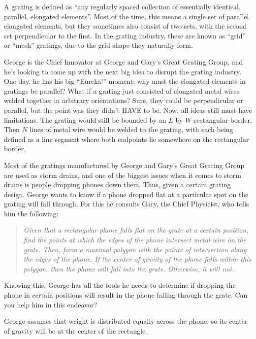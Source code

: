 
A grating is defined as ``any regularly spaced collection of essentially identical, parallel, elongated
elements''. Most of the time, this means a single set of parallel elongated elements, but they sometimes also
consist of two sets, with the second set perpendicular to the first. In the grating industry, these are
known as ``grid'' or ``mesh'' gratings, due to the grid shape they naturally form.

George is the Chief Innovator at George and Gary's Great Grating Group, and he's looking to come up with the 
next big idea to disrupt the grating industry. One day, he has his big ``Eureka!'' moment: why must the
elongated elements in gratings be parallel? What if a grating just consisted of elongated metal wires welded
together in arbitrary orientations? Sure, they could be perpendicular or parallel, but the point was they
didn't HAVE to be. Now, all ideas still must have limitations. The grating would still be bounded by an
$L$ by $W$ rectangular border. Then $N$ lines of metal wire would be welded to the grating, with each
being defined as a line segment where both endpoints lie somewhere on the rectangular border.

Most of the gratings manufactured by George and Gary's Great Grating Group are used as storm drains, and
one of the biggest issues when it comes to storm drains is people dropping phones down them. Thus,
given a certain grating design, George wants to know if a phone dropped flat at a particular spot on the
grating will fall through. For this he consults Gary, the Chief Physicist, who tells him the following:

\begin{quotation}
\textit{
    Given that a rectangular phone falls flat on the grate at a certain position, find the points
    at which the edges of the phone intersect metal wire on the grate. Then, form a maximal polygon with
    the points of intersection along the edges of the phone. If the center of gravity of the phone falls
    within this polygon, then the phone will fall into the grate. Otherwise, it will not.
}
\end{quotation}

Knowing this, George has all the tools he needs to determine if dropping the phone in certain positions will
result in the phone falling through the grate. Can you help him in this endeavor?

George assumes that weight is distributed equally across the phone, so its center of gravity will be at the
center of the rectangle.

